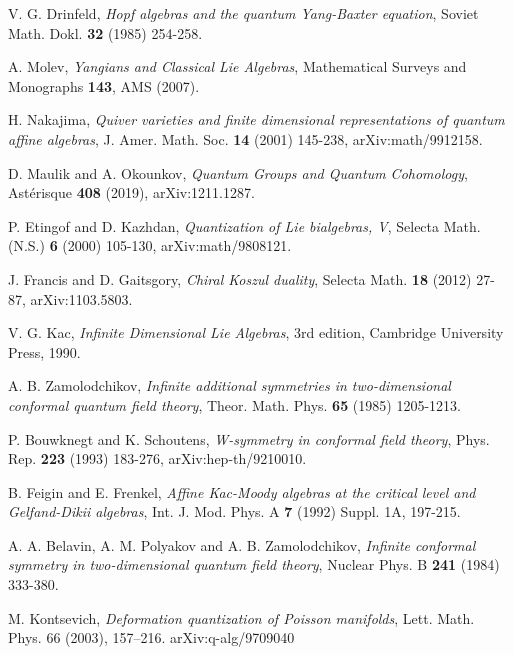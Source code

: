 \begin{thebibliography}{99}

V. G. Drinfeld, \emph{Hopf algebras and the quantum Yang-Baxter equation}, 
Soviet Math. Dokl. \textbf{32} (1985) 254-258.

A. Molev, \emph{Yangians and Classical Lie Algebras}, 
Mathematical Surveys and Monographs \textbf{143}, AMS (2007).

H. Nakajima, \emph{Quiver varieties and finite dimensional representations of 
quantum affine algebras}, 
J. Amer. Math. Soc. \textbf{14} (2001) 145-238, arXiv:math/9912158.

D. Maulik and A. Okounkov, \emph{Quantum Groups and Quantum Cohomology}, 
Astérisque \textbf{408} (2019), arXiv:1211.1287.


P. Etingof and D. Kazhdan, \emph{Quantization of Lie bialgebras, V}, 
Selecta Math. (N.S.) \textbf{6} (2000) 105-130, arXiv:math/9808121.

J. Francis and D. Gaitsgory, \emph{Chiral Koszul duality}, 
Selecta Math. \textbf{18} (2012) 27-87, arXiv:1103.5803.


V. G. Kac, \emph{Infinite Dimensional Lie Algebras}, 
3rd edition, Cambridge University Press, 1990.

A. B. Zamolodchikov, \emph{Infinite additional symmetries in two-dimensional conformal quantum field theory},
Theor. Math. Phys. \textbf{65} (1985) 1205-1213.

P. Bouwknegt and K. Schoutens, \emph{W-symmetry in conformal field theory},
Phys. Rep. \textbf{223} (1993) 183-276, arXiv:hep-th/9210010.

B. Feigin and E. Frenkel, \emph{Affine Kac-Moody algebras at the critical level and Gelfand-Dikii algebras},
Int. J. Mod. Phys. A \textbf{7} (1992) Suppl. 1A, 197-215.

A. A. Belavin, A. M. Polyakov and A. B. Zamolodchikov, 
\emph{Infinite conformal symmetry in two-dimensional quantum field theory}, 
Nuclear Phys. B \textbf{241} (1984) 333-380.

 M. Kontsevich,
\emph{Deformation quantization of Poisson manifolds},
Lett. Math. Phys. 66 (2003), 157--216.
arXiv:q-alg/9709040


\end{thebibliography}
